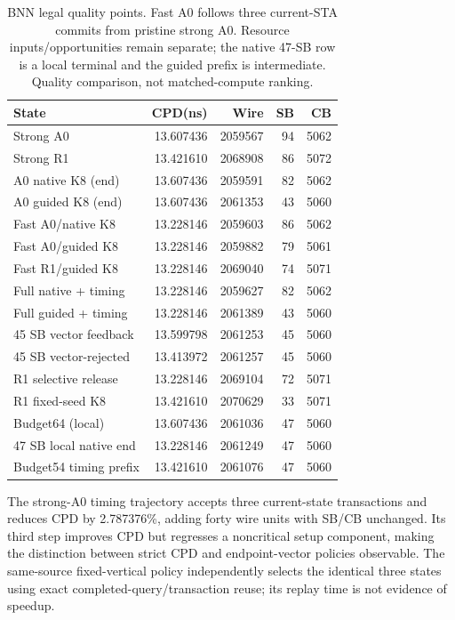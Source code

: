 \documentclass[conference,10pt]{IEEEtran}
\begin{document}
\begin{table}[t]
\centering\caption{BNN legal quality points. Fast A0 follows three current-STA commits from pristine strong A0. Resource inputs/opportunities remain separate; the native 47-SB row is a local terminal and the guided prefix is intermediate. Quality comparison, not matched-compute ranking.}
\label{tab:bnn}
\small
\begin{tabular}{lrrrr}\hline
State & CPD(ns) & Wire & SB & CB\\\hline
Strong A0 &13.607436&2059567&94&5062\\
Strong R1 &13.421610&2068908&86&5072\\
A0 native K8 (end) &13.607436&2059591&82&5062\\
A0 guided K8 (end) &13.607436&2061353&43&5060\\
Fast A0/native K8 &13.228146&2059603&86&5062\\
Fast A0/guided K8 &13.228146&2059882&79&5061\\
Fast R1/guided K8 &13.228146&2069040&74&5071\\
Full native + timing &13.228146&2059627&82&5062\\
Full guided + timing &13.228146&2061389&43&5060\\
45 SB vector feedback &13.599798&2061253&45&5060\\
45 SB vector-rejected &13.413972&2061257&45&5060\\
R1 selective release &13.228146&2069104&72&5071\\
R1 fixed-seed K8 &13.421610&2070629&33&5071\\
Budget64 (local) &13.607436&2061036&47&5060\\
47 SB local native end &13.228146&2061249&47&5060\\
Budget54 timing prefix &13.421610&2061076&47&5060\\\hline
\end{tabular}
\end{table}
The strong-A0 timing trajectory accepts three current-state transactions and reduces CPD by 2.787376\%, adding forty wire units with SB/CB unchanged. Its third step improves CPD but regresses a noncritical setup component, making the distinction between strict CPD and endpoint-vector policies observable. The same-source fixed-vertical policy independently selects the identical three states using exact completed-query/transaction reuse; its replay time is not evidence of speedup.
\end{document}
